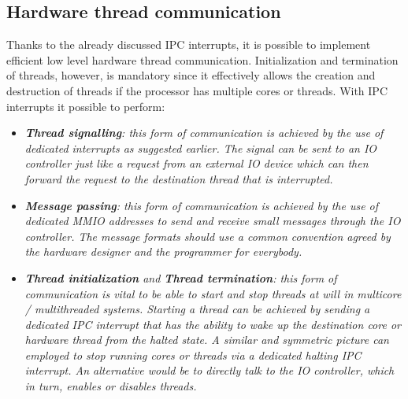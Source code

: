     \subsection{Hardware thread communication}

        \vspace{10pt}

        Thanks to the already discussed IPC interrupts, it is possible to implement efficient low level hardware thread communication. Initialization and termination of threads, however, is mandatory since it effectively allows the creation and destruction of threads if the processor has multiple cores or threads. With IPC interrupts it possible to perform:

        \begin{itemize}

            \item \textit{\textbf{Thread signalling}: this form of communication is achieved by the use of dedicated interrupts as suggested earlier. The signal can be sent to an IO controller just like a request from an external IO device which can then forward the request to the destination thread that is interrupted.}

            \item \textit{\textbf{Message passing}: this form of communication is achieved by the use of dedicated MMIO addresses to send and receive small messages through the IO controller. The message formats should use a common convention agreed by the hardware designer and the programmer for everybody.}

            \item \textit{\textbf{Thread initialization} and \textbf{Thread termination}: this form of communication is vital to be able to start and stop threads at will in multicore / multithreaded systems. Starting a thread can be achieved by sending a dedicated IPC interrupt that has the ability to wake up the destination core or hardware thread from the halted state. A similar and symmetric picture can employed to stop running cores or threads via a dedicated halting IPC interrupt. An alternative would be to directly talk to the IO controller, which in turn, enables or disables threads.}

        \end{itemize}

